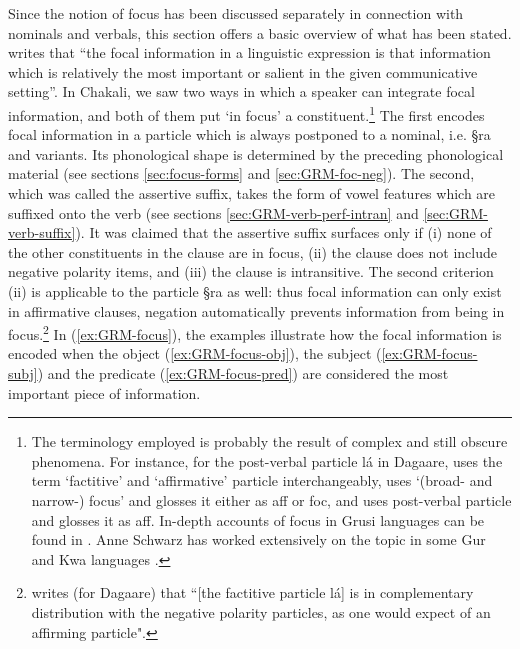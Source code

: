 Since the notion of focus has been discussed separately in connection with
nominals and verbals, this section offers a basic overview of what has been
stated.  \citet[326]{Dik97} writes that   ``the focal information in a
linguistic expression is
that
information which is relatively the most important or salient in the given
communicative setting''.  In Chakali, we saw  two ways in which a
speaker can integrate focal information, and both of them put `in focus' a
constituent.\footnote{The  terminology employed is probably the result
of  complex and still obscure phenomena. For instance, for the
post-verbal particle {\F lá} in Dagaare, \cite{Bodo97} uses the term
`factitive' and `affirmative' particle interchangeably, \cite{Daku05} uses
`(broad- and narrow-)  focus' and glosses it either as {\sc aff} or {\sc foc},
and
\cite{Saan03} uses post-verbal particle and glosses it as {\sc aff}. In-depth
accounts of focus in Grusi languages can be found in \cite{Blas90, Mcgi99}.
 Anne Schwarz has worked extensively on the topic in some Gur and Kwa
languages \citep{Schw10}.}   The first
encodes focal information in a particle which is always
postponed to a nominal, i.e. {\S ra} and variants. Its  phonological shape is
determined by the
preceding phonological material (see sections \ref{sec:focus-forms} and 
\ref{sec:GRM-foc-neg}). The second, which was called the assertive suffix, takes
the form of vowel features which
are suffixed onto the verb  (see sections \ref{sec:GRM-verb-perf-intran} and 
\ref{sec:GRM-verb-suffix}). It was claimed that  the assertive suffix surfaces
only if (i) none of the other constituents in the
clause are in focus, (ii) the clause does not include negative polarity items,
and (iii) the clause is intransitive.
The second criterion (ii) is applicable to the particle {\S ra} as well: thus
focal
information can only exist in affirmative clauses, negation automatically
prevents information from being in focus.\footnote{\citet[94]{Bodo97} writes
(for
Dagaare) that
``[the factitive particle {\F lá}] is in complementary distribution with the
negative polarity particles, as one would expect of an affirming particle".}  In
 (\ref{ex:GRM-focus}),  the
examples illustrate  how the  focal information is
encoded when the object (\ref{ex:GRM-focus-obj}), the subject
(\ref{ex:GRM-focus-subj}) and the predicate  (\ref{ex:GRM-focus-pred}) are
considered the most important piece of information. 


